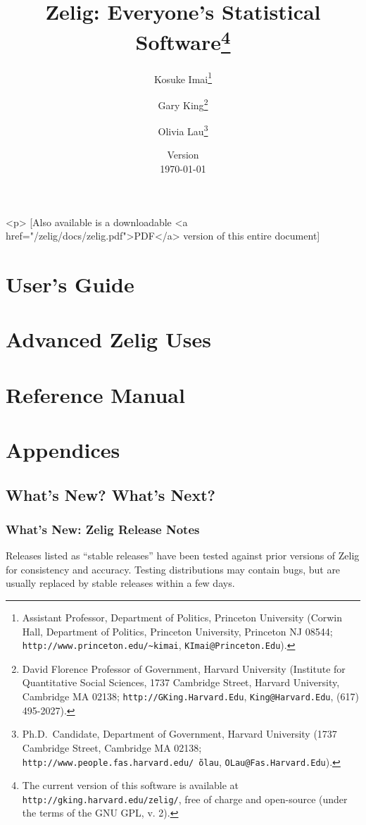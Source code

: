 \documentclass[oneside,letterpaper,12pt]{book}
\title{Zelig: Everyone's Statistical Software\thanks{The current
    version of this software is available at
    \texttt{http://gking.harvard.edu/zelig/}, free of charge and
    open-source (under the terms of the GNU GPL, v. 2).}}
\author{Kosuke
  Imai\thanks{Assistant Professor, Department of Politics, Princeton
    University (Corwin Hall, Department of Politics, Princeton
    University, Princeton NJ 08544; \texttt{http://www.princeton.edu/\~{}kimai},
    \texttt{KImai@Princeton.Edu}).}
\and %
Gary King\thanks{David Florence Professor of Government, Harvard
  University (Institute for Quantitative Social Sciences, 1737 Cambridge 
Street, Harvard University, Cambridge MA 02138;
  \texttt{http://GKing.Harvard.Edu}, \texttt{King@Harvard.Edu}, (617)
  495-2027).}
\and %
Olivia Lau\thanks{Ph.D.\ Candidate, Department of Government, Harvard
  University (1737 Cambridge Street, Cambridge MA 02138;
  \texttt{http://www.people.fas.harvard.edu/\~\,olau},
  \texttt{OLau@Fas.Harvard.Edu}).}}
\date{Version \\ \today}
\begin{document}
\maketitle
\begin{rawhtml}
  <p>
  [Also available is a downloadable <a href="/zelig/docs/zelig.pdf">PDF</a>
  version of this entire document]
\end{rawhtml}

\tableofcontents

\nobibliography*

%

%

\part[User's Guide]{User's Guide}

%
%
%
%

\part{Advanced Zelig Uses}

%
%
%

\part{Reference Manual}

%

\appendix

\part[Appendices]{Appendices}

%

%

\chapter{What's New?  What's Next?}

\section{What's New:  Zelig Release Notes}\label{release.notes}

Releases listed as ``stable releases'' have been tested against prior
versions of Zelig for consistency and accuracy.  Testing distributions
may contain bugs, but are usually replaced by stable releases within a
few days. 
\end{document}
